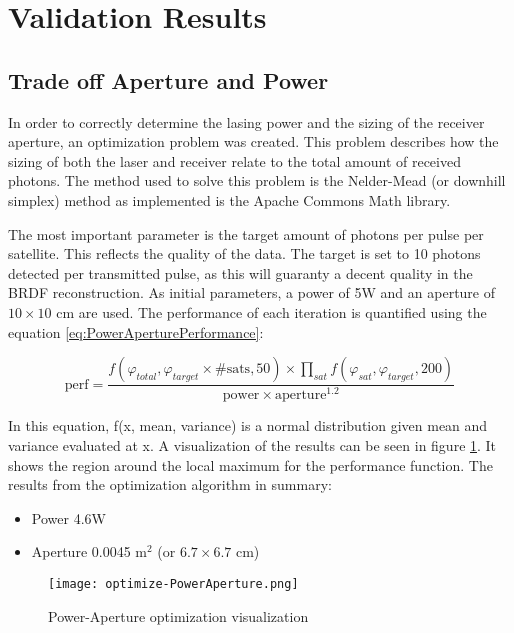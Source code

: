 \section{Validation Results}
\label{sec:ValidationResults}

\subsection{Trade off Aperture and Power}
\label{sec:PowerApertureTradeoff}

In order to correctly determine the lasing power and the sizing of the receiver aperture, an optimization problem was created. This problem describes how the sizing of both the laser and receiver relate to the total amount of received photons. The method used to solve this problem is the Nelder-Mead (or downhill simplex) method as implemented is the Apache Commons Math library.

The most important parameter is the target amount of photons per pulse per satellite. This reflects the quality of the data. The target is set to 10 photons detected per transmitted pulse, as this will guaranty a decent quality in the BRDF reconstruction. As initial parameters, a power of 5W and an aperture of $10\times10$ cm are used. The performance of each iteration is quantified using the equation \ref{eq:PowerAperturePerformance}:

\begin{equation}
	\text{perf} = \frac {f(\varphi_{total}, \varphi_{target} \times \text{\# sats}, 50) \times 
												\displaystyle\prod_{sat} f(\varphi_{sat}, \varphi_{target}, 200) }
											{ \text{power} \times \text{aperture}^{1.2}}
	\label{eq:PowerAperturePerformance}
\end{equation}

In this equation, f(x, mean, variance) is a normal distribution given mean and variance evaluated at x. A visualization of the results can be seen in figure \ref{fig:PowerAperturePerformance}. It shows the region around the local maximum for the performance function. The results from the optimization algorithm in summary:

\begin{itemize}
	\item Power 4.6W
	\item Aperture 0.0045 m$^2$ (or $6.7\times6.7$ cm)
\end{itemize}

\begin{figure}[ht]
	\centering
	\texttt{[image: optimize-PowerAperture.png]}%
		\caption{Power-Aperture optimization visualization}%
		\label{fig:PowerAperturePerformance}%
\end{figure}

